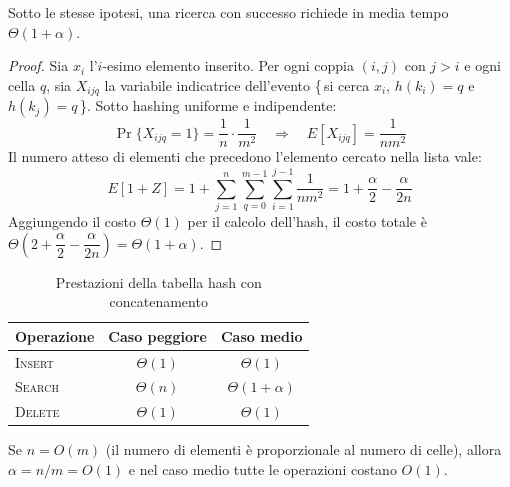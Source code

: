 \begin{teorema}
	Sotto le stesse ipotesi, una ricerca con successo richiede in media tempo
	$\Theta(1 + \alpha)$.
\end{teorema}

\begin{proof}
	Sia $x_i$ l'$i$-esimo elemento inserito. Per ogni coppia $(i,j)$ con $j > i$
	e ogni cella $q$, sia $X_{ijq}$ la variabile indicatrice dell'evento
	\{\,si cerca $x_i$, $h(k_i)=q$ e $h(k_j)=q$\,\}.
	Sotto hashing uniforme e indipendente:
	\[
	\Pr\{X_{ijq}=1\} = \frac{1}{n} \cdot \frac{1}{m^2}
	\quad\Rightarrow\quad E[X_{ijq}] = \frac{1}{nm^2}
	\]
	Il numero atteso di elementi che precedono l'elemento cercato nella lista
	vale:
	\[
	E[1 + Z]
	= 1 + \sum_{j=1}^{n}\sum_{q=0}^{m-1}\sum_{i=1}^{j-1} \frac{1}{nm^2}
	= 1 + \frac{\alpha}{2} - \frac{\alpha}{2n}
	\]
	Aggiungendo il costo $\Theta(1)$ per il calcolo dell'hash, il costo totale
	è $\Theta\!\left(2 + \dfrac{\alpha}{2} - \dfrac{\alpha}{2n}\right)
	= \Theta(1 + \alpha)$.
\end{proof}

\begin{table}[ht]
	\centering
	\caption{Prestazioni della tabella hash con concatenamento}
	\begin{tabular}{lcc}
		\toprule
		\textbf{Operazione} & \textbf{Caso peggiore} & \textbf{Caso medio}  \\
		\midrule
		\textsc{Insert}     & $\Theta(1)$             & $\Theta(1)$           \\
		\textsc{Search}     & $\Theta(n)$             & $\Theta(1 + \alpha)$  \\
		\textsc{Delete}     & $\Theta(1)$             & $\Theta(1)$           \\
		\bottomrule
	\end{tabular}
\end{table}

\begin{nota}
	Se $n = O(m)$ (il numero di elementi è proporzionale al numero di celle),
	allora $\alpha = n/m = O(1)$ e nel caso medio tutte le operazioni costano
	$O(1)$.
\end{nota}

